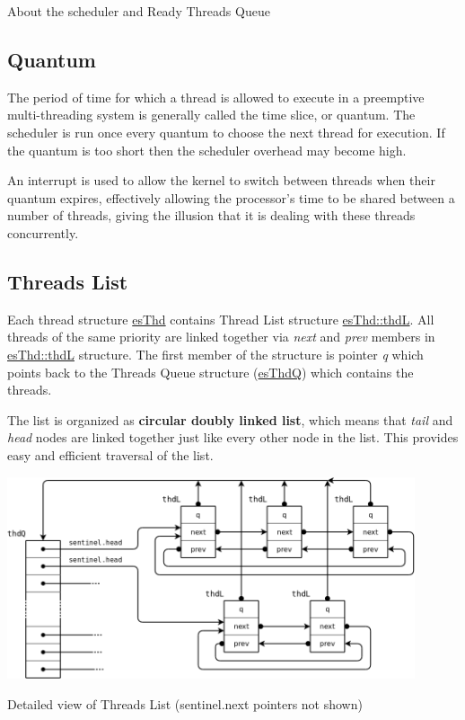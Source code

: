 About the scheduler and Ready Threads Queue\hypertarget{scheduler_sched_quantum}{}\subsection{Quantum}\label{scheduler_sched_quantum}
The period of time for which a thread is allowed to execute in a preemptive multi-\/threading system is generally called the time slice, or {\ttfamily quantum}. The scheduler is run once every quantum to choose the next thread for execution. If the quantum is too short then the scheduler overhead may become high.

An interrupt is used to allow the kernel to switch between threads when their quantum expires, effectively allowing the processor's time to be shared between a number of threads, giving the illusion that it is dealing with these threads concurrently.\hypertarget{scheduler_sched_thdL}{}\subsection{Threads List}\label{scheduler_sched_thdL}
Each thread structure \hyperlink{structesThd}{es\-Thd} contains Thread List structure \hyperlink{structesThd_a69f72ac3b1f6199da48b41804f353325}{es\-Thd\-::thd\-L}. All threads of the same priority are linked together via {\itshape next} and {\itshape prev} members in \hyperlink{structesThd_a69f72ac3b1f6199da48b41804f353325}{es\-Thd\-::thd\-L} structure. The first member of the structure is pointer {\itshape q} which points back to the Threads Queue structure (\hyperlink{structesThdQ}{es\-Thd\-Q}) which contains the threads.

The list is organized as {\bfseries circular doubly linked list}, which means that {\itshape tail} and {\itshape head} nodes are linked together just like every other node in the list. This provides easy and efficient traversal of the list.


\begin{DoxyImage}
\includegraphics[width=12cm]{thdL.png}
\caption{Detailed view of Threads List (sentinel.next pointers not shown)}
\end{DoxyImage}


